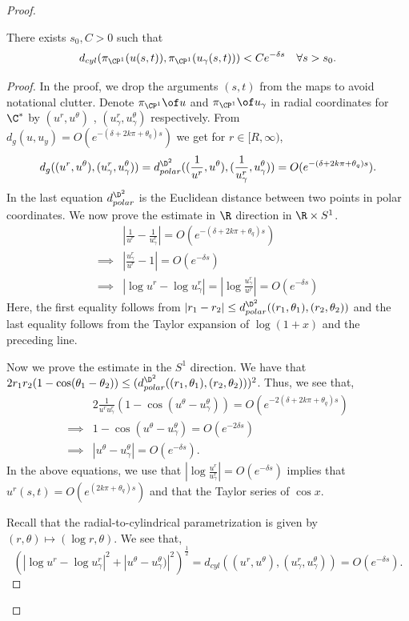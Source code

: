 \begin{proof}
\begin{lemma} There exists $s_0,C >0$ such that
$$d_{cyl} (\pi_{\CP^1} (u(s,t)),\pi_{\CP^1}(u_\gamma(s,t))) < Ce^{-\delta s} \quad  \forall s>s_0.$$
\end{lemma}

\begin{proof}
In the proof, we drop the arguments $(s,t)$ from the maps to avoid notational clutter. Denote $\pi_{\CP^1} \of u$  and $\pi_{\CP^1} \of u_\gamma$ in radial coordinates for $ \C^*$ by  $(u^r,u^\theta)$ , $(u^r_\gamma,u^\theta_\gamma)$ respectively. From $d_{g} (u,u_y)=O(e^{- (\delta + 2k\pi + \theta_q)s})$ we get for $r\in [R,\infty)$, $$d_g((u^r,u^\theta),(u^r_\gamma,u^\theta_\gamma)) = d^{\D^2}_{polar}((\frac{1}{u^r},u^\theta),(\frac{1}{u_\gamma^r},u_\gamma^\theta)) = O(e^{- (\delta + 2k\pi + \theta_q)s}) .$$
In the last equation $d^{\D^2}_{polar}$ is the Euclidean distance between two points in polar coordinates.  We now  prove the estimate in $\R$ direction in $\R \times S^1$.
\begin{align*}
    &|\frac{1}{u^r} - \frac{1}{u^r_\gamma}| = O(e^{- (\delta + 2k\pi + \theta_q)s})\\
     \implies &| \frac{u_\gamma^r}{u^r} - 1|= O(e^{- \delta s})\\
     \implies & |\log u^r  - \log u^r_\gamma |=| \log \frac{u_\gamma^r}{u^r} | = O(e^{- \delta s})
\end{align*}
Here, the first equality follows from $|r_1-r_2| \leq d^{\D^2}_{polar}((r_1,\theta_1),(r_2,\theta_2))$ and the last equality follows from the Taylor expansion of $\log(1+x)$ and the preceding line. 

Now we prove the estimate in the $S^1$ direction. We have that $2r_1r_2(1-\cos (\theta_1 - \theta_2)) \leq (d^{\D^2}_{polar}((r_1,\theta_1),(r_2,\theta_2)))^2$. Thus, we see that, 
\begin{align*}
    & 2\frac{1}{u^ru^r_\gamma}(1-\cos (u^\theta - u^\theta_\gamma)) = O(e^{- 2(\delta + 2k\pi + \theta_q)s})\\
    \implies & 1-\cos (u^\theta - u^\theta_\gamma)= O(e^{- 2\delta s})\\
    \implies & |u^\theta - u^\theta_\gamma|=O(e^{- \delta s}).
\end{align*}
In the above equations, we use that $|\log\frac{u^r}{u^r_\gamma}| =  O(e^{- \delta s})  $ implies that $u^r(s,t)= O(e^{(2k\pi + \theta_q)s})$ and that the Taylor series of $\cos x $.

\noindent Recall that the radial-to-cylindrical parametrization is given by $(r,\theta) \mapsto (\log r , \theta)$. We see that,
$$(|\log u^r -\log u^r_\gamma|^2 + |u^\theta- u^\theta_\gamma)|^2)^{\frac{1}{2}}=  d_{cyl}((u^r,u^\theta),(u^r_\gamma,u^\theta_\gamma)) = O(e^{- \delta s}).$$


\end{proof}
\end{proof}
